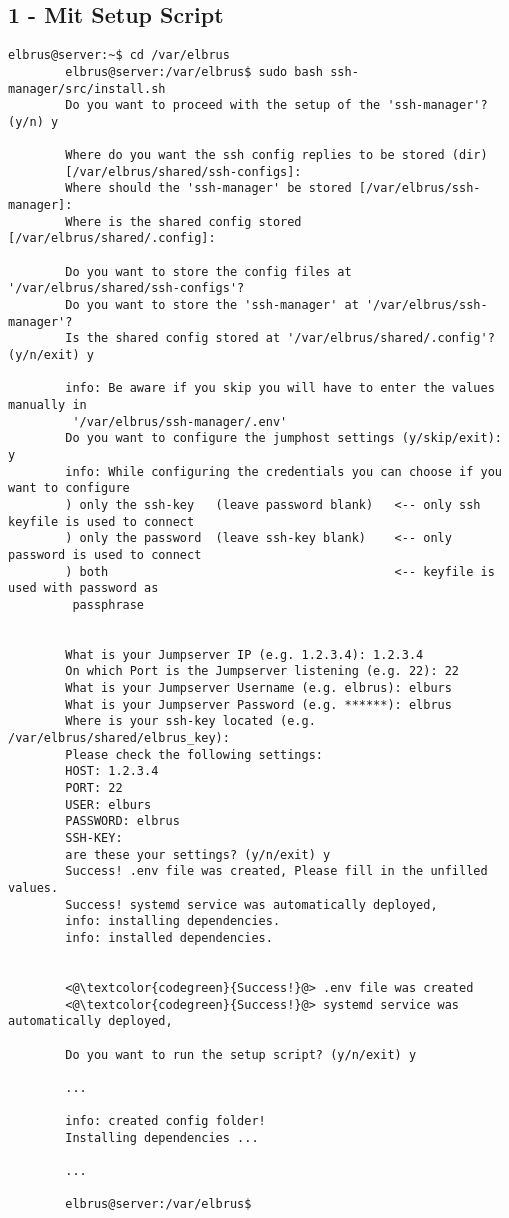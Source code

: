 	\subsection{1 - Mit Setup Script}
	
	\lstset{style=commands}
	\begin{lstlisting}[caption={Ausführen des 'install.sh' Scripts.}]
		elbrus@server:~$ cd /var/elbrus
		elbrus@server:/var/elbrus$ sudo bash ssh-manager/src/install.sh 
		Do you want to proceed with the setup of the 'ssh-manager'? (y/n) y
		
		Where do you want the ssh config replies to be stored (dir) 
		[/var/elbrus/shared/ssh-configs]:
		Where should the 'ssh-manager' be stored [/var/elbrus/ssh-manager]: 
		Where is the shared config stored [/var/elbrus/shared/.config]:
		
		Do you want to store the config files at '/var/elbrus/shared/ssh-configs'?
		Do you want to store the 'ssh-manager' at '/var/elbrus/ssh-manager'?
		Is the shared config stored at '/var/elbrus/shared/.config'? (y/n/exit) y
		
		info: Be aware if you skip you will have to enter the values manually in
		 '/var/elbrus/ssh-manager/.env'
		Do you want to configure the jumphost settings (y/skip/exit): y
		info: While configuring the credentials you can choose if you want to configure
		) only the ssh-key   (leave password blank)   <-- only ssh keyfile is used to connect
		) only the password  (leave ssh-key blank)    <-- only password is used to connect
		) both                                        <-- keyfile is used with password as 
		 passphrase
		
		
		What is your Jumpserver IP (e.g. 1.2.3.4): 1.2.3.4
		On which Port is the Jumpserver listening (e.g. 22): 22
		What is your Jumpserver Username (e.g. elbrus): elburs
		What is your Jumpserver Password (e.g. ******): elbrus
		Where is your ssh-key located (e.g. /var/elbrus/shared/elbrus_key):
		Please check the following settings:
		HOST: 1.2.3.4
		PORT: 22
		USER: elburs
		PASSWORD: elbrus
		SSH-KEY:
		are these your settings? (y/n/exit) y
		Success! .env file was created, Please fill in the unfilled values.
		Success! systemd service was automatically deployed,
		info: installing dependencies.
		info: installed dependencies.
		
		
		<@\textcolor{codegreen}{Success!}@> .env file was created
		<@\textcolor{codegreen}{Success!}@> systemd service was automatically deployed,
		
		Do you want to run the setup script? (y/n/exit) y
		
		...
		
		info: created config folder!
		Installing dependencies ...
	
		...
		
		elbrus@server:/var/elbrus$
	\end{lstlisting}
	\newpage
	
